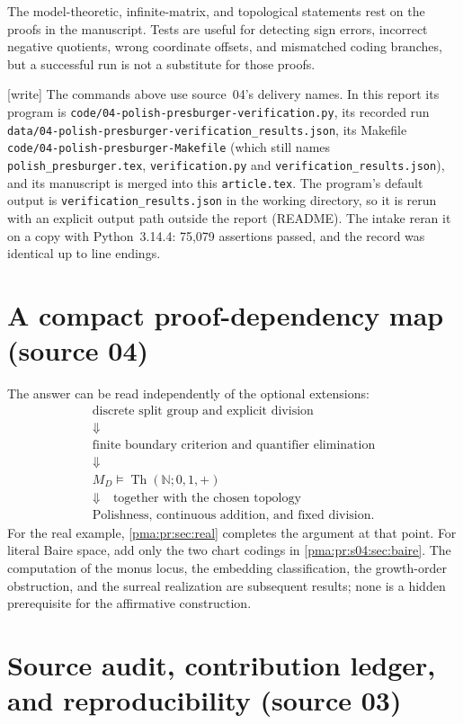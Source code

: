 \documentclass[11pt]{article}
\numberwithin{equation}{section}
\theoremstyle{definition}
\theoremstyle{remark}
\newcommand{\N}{\mathbb N}
\newcommand{\Th}{\operatorname{Th}}
\newcommand{\writetag}{\textup{\textsf{\small[write]}}}
\newcommand{\fn}[1]{\nolinkurl{#1}}
\begin{document}
The model-theoretic, infinite-matrix, and topological statements rest on the
proofs in the manuscript. Tests are useful for detecting sign errors,
incorrect negative quotients, wrong coordinate offsets, and mismatched
coding branches, but a successful run is not a substitute for those proofs.

\noindent\writetag{} The commands above use source~04's delivery names. In
this report its program is \fn{code/04-polish-presburger-verification.py}, its
recorded run \fn{data/04-polish-presburger-verification_results.json}, its
Makefile \fn{code/04-polish-presburger-Makefile} (which still names
\fn{polish_presburger.tex}, \fn{verification.py} and
\fn{verification_results.json}), and its manuscript is merged into this
\fn{article.tex}. The program's default output is
\fn{verification_results.json} in the working directory, so it is rerun with
an explicit output path outside the report (README). The intake reran it on a
copy with Python~3.14.4: 75{,}079 assertions passed, and the record was
identical up to line endings.

\section{A compact proof-dependency map (source 04)}\label{pma:pr:app:dependency}

The answer can be read independently of the optional extensions:
\[
 \begin{gathered}
 \text{discrete split group and explicit division}\\
 \Downarrow\\
 \text{finite boundary criterion and quantifier elimination}\\
 \Downarrow\\
 M_D\models\Th(\N;0,1,+)\\
 \Downarrow\quad\text{together with the chosen topology}\\
 \text{Polishness, continuous addition, and fixed division}.
 \end{gathered}
\]
For the real example, \cref{pma:pr:sec:real} completes the argument at that point.
For literal Baire space, add only the two chart codings in
\cref{pma:pr:s04:sec:baire}. The computation of the monus locus, the embedding
classification, the growth-order obstruction, and the surreal realization
are subsequent results; none is a hidden prerequisite for the affirmative
construction.

\section{Source audit, contribution ledger, and reproducibility (source 03)}
\label{pma:bor:app:audit}
\end{document}
